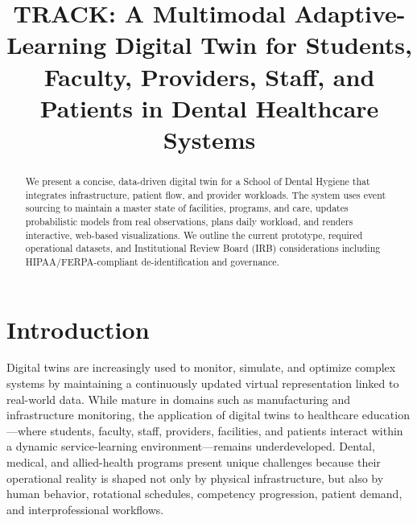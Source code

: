 \documentclass[Afour,sageh,times]{sagej}
\begin{document}
\title{TRACK: A Multimodal Adaptive-Learning Digital Twin for Students, Faculty, Providers, Staff, and Patients in Dental Healthcare Systems}





\begin{abstract}
We present a concise, data-driven digital twin for a School of Dental Hygiene that integrates infrastructure, patient flow, and provider workloads. The system uses event sourcing to maintain a master state of facilities, programs, and care, updates probabilistic models from real observations, plans daily workload, and renders interactive, web-based visualizations. We outline the current prototype, required operational datasets, and Institutional Review Board (IRB) considerations including HIPAA/FERPA-compliant de-identification and governance.
\end{abstract}

\maketitle



\section{Introduction}

Digital twins are increasingly used to monitor, simulate, and optimize complex systems by maintaining a continuously updated virtual representation linked to real-world data. While mature in domains such as manufacturing and infrastructure monitoring, the application of digital twins to healthcare education—where students, faculty, staff, providers, facilities, and patients interact within a dynamic service-learning environment—remains underdeveloped. Dental, medical, and allied-health programs present unique challenges because their operational reality is shaped not only by physical infrastructure, but also by human behavior, rotational schedules, competency progression, patient demand, and interprofessional workflows.
\end{document}
